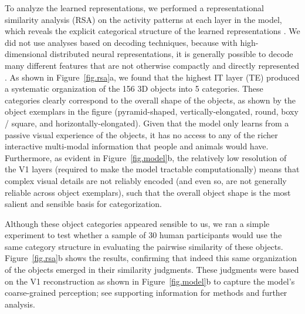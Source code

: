 \documentclass[11pt,twoside]{article}
\newif\myifpdf
\begin{document}
To analyze the learned representations, we performed a representational similarity analysis (RSA) on the activity patterns at each layer in the model, which reveals the explicit categorical structure of the learned representations \citep{KriegeskorteMurBandettini08,CadieuHongYaminsEtAl14}. We did not use analyses based on decoding techniques, because with high-dimensional distributed neural representations, it is generally possible to decode many different features that are not otherwise compactly and directly represented \citep{FusiMillerRigotti16}.  As shown in Figure~\ref{fig.rsa}a, we found that the highest IT layer (TE) produced a systematic organization of the 156 3D objects into 5 categories.  These categories clearly correspond to the overall shape of the objects, as shown by the object exemplars in the figure (pyramid-shaped, vertically-elongated, round, boxy / square, and horizontally-elongated).  Given that the model only learns from a passive visual experience of the objects, it has no access to any of the richer interactive multi-modal information that people and animals would have.  Furthermore, as evident in Figure~\ref{fig.model}b, the relatively low resolution of the V1 layers (required to make the model tractable computationally) means that complex visual details are not reliably encoded (and even so, are not generally reliable across object exemplars), such that the overall object shape is the most salient and sensible basis for categorization.

Although these object categories appeared sensible to us, we ran a simple experiment to test whether a sample of 30 human participants would use the same category structure in evaluating the pairwise similarity of these objects.  Figure~\ref{fig.rsa}b shows the results, confirming that indeed this same organization of the objects emerged in their similarity judgments.  These judgments were based on the V1 reconstruction as shown in Figure~\ref{fig.model}b to capture the model's coarse-grained perception; see supporting information for methods and further analysis.
\end{document}
